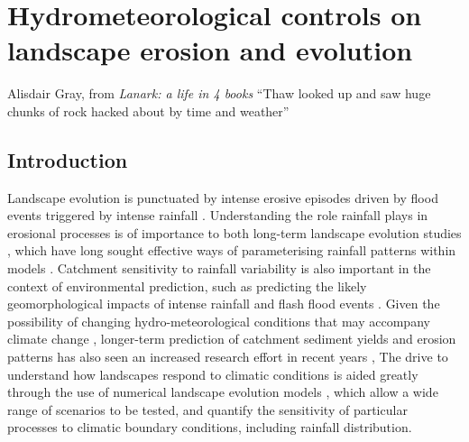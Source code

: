 \chapter{Hydrometeorological controls on landscape erosion and evolution}
\label{chapter_hydrogeomorph}

\begin{chapquote}{Alisdair Gray, from \textit{Lanark: a life in 4 books}}
``Thaw looked up and saw huge chunks of rock hacked about by time and weather''
\end{chapquote}

\section{Introduction}

Landscape evolution is punctuated by intense erosive episodes driven by flood events triggered by intense rainfall \citep{Wolman1960,newson1980geomorphological,Costa1995}. Understanding the role rainfall plays in erosional processes is of importance to both long-term landscape evolution studies \citep[e.g.][]{rinaldo1995geomorphological,tucker1997drainage,Tucker2000}, which have long sought effective ways of parameterising rainfall patterns within models \citep[e.g][]{Eagleson1978}.  Catchment sensitivity to rainfall variability is also important in the context of environmental prediction, such as predicting the likely geomorphological impacts of intense rainfall and flash flood events \citep[e.g.][]{lane2007interactions,deluis2010rainfall,milan2012geomorphic}. Given the possibility of changing hydro-meteorological conditions that may accompany climate change \citep{Kendon2014}, longer-term prediction of catchment sediment yields and erosion patterns has also seen an increased research effort in recent years \citep{coulthard2000modelling,Coulthard2012,hancock2017sediment}, The drive to understand how landscapes respond to climatic conditions is aided greatly through the use of numerical landscape evolution models \citep{Tucker2010}, which allow a wide range of scenarios to be tested, and quantify the sensitivity of particular processes to climatic boundary conditions, including rainfall distribution.

